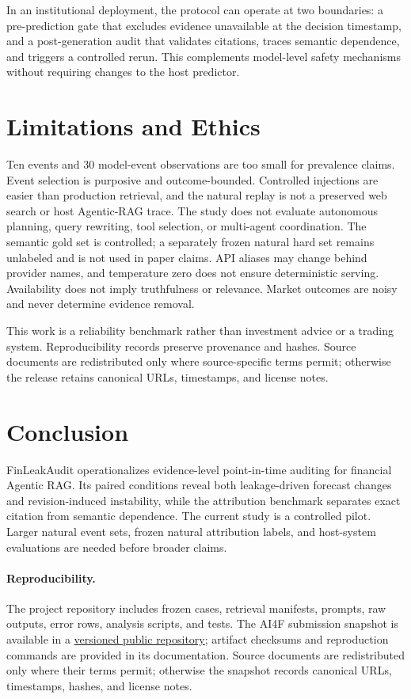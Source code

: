 \documentclass[10pt,twocolumn]{article}
\newcommand{\system}{FinLeakAudit}
\begin{document}
In an institutional deployment, the protocol can operate at two boundaries: a
pre-prediction gate that excludes evidence unavailable at the decision timestamp, and
a post-generation audit that validates citations, traces semantic dependence, and
triggers a controlled rerun. This complements model-level safety mechanisms without
requiring changes to the host predictor.

\section{Limitations and Ethics}

Ten events and 30 model-event observations are too small for prevalence claims. Event
selection is purposive and outcome-bounded. Controlled injections are easier than
production retrieval, and the natural replay is not a preserved web search or host
Agentic-RAG trace. The study does not evaluate autonomous planning, query rewriting,
tool selection, or multi-agent coordination. The semantic gold set is controlled; a
separately frozen natural hard set remains unlabeled and is not used in paper claims.
API aliases may change behind provider names, and temperature zero does not ensure
deterministic serving. Availability does not imply truthfulness or relevance. Market
outcomes are noisy and never determine evidence removal.

This work is a reliability benchmark rather than investment advice or a trading
system. Reproducibility records preserve provenance and hashes. Source documents are
redistributed only where source-specific terms permit; otherwise the release retains
canonical URLs, timestamps, and license notes.

\section{Conclusion}

\system{} operationalizes evidence-level point-in-time auditing for financial
Agentic RAG. Its paired conditions reveal both leakage-driven forecast changes and
revision-induced instability, while the attribution benchmark separates exact
citation from semantic dependence. The current study is a controlled pilot. Larger
natural event sets, frozen natural attribution labels, and host-system evaluations are
needed before broader claims.

\paragraph{Reproducibility.}
The project repository includes frozen cases, retrieval manifests, prompts, raw
outputs, error rows, analysis scripts, and tests. The AI4F submission snapshot is
available in a \href{https://github.com/yixi1120/FinLeakAudit-KB/tree/ai4f-2026-submission-v2}{versioned public repository}; artifact checksums and reproduction commands are
provided in its documentation. Source documents are redistributed only where their
terms permit; otherwise the snapshot records canonical URLs, timestamps, hashes, and
license notes.
\end{document}
